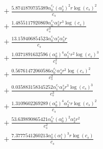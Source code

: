 \documentclass[10pt]{article}
\begin{document}
\begin{align*}
&{}  + \frac{5.8741870735389 \alpha_{0}^{c_s} \left(\alpha_{2}^s\right)^{2} r \log{\left(c_{s} \right)}^{2}}{c_{s}} \\
&{}  + \frac{1.4855117920869 \alpha_{0}^{c_s} \alpha_{3}^s r^{3} \log{\left(c_{s} \right)}}{c_{s}^{3}} \\
&{}  + \frac{13.159406854523 \alpha_{0}^{c_s} \alpha_{1}^s \alpha_{3}^s r}{c_{s}} \\
&{}  + \frac{1.0371891632596 \left(\alpha_{0}^s\right)^{4} \alpha_{1}^{c_s} r^{2} \log{\left(c_{s} \right)}^{3}}{c_{s}^{2}} \\
&{}  + \frac{0.56761472060586 \alpha_{0}^{c_s} \alpha_{4}^s r^{2} \log{\left(c_{s} \right)}^{2}}{c_{s}^{2}} \\
&{}  + \frac{0.035883158345252 \alpha_{1}^{c_s} \alpha_{2}^s r^{3} \log{\left(c_{s} \right)}^{3}}{c_{s}^{3}} \\
&{}  + \frac{1.3109602269289 \left(\alpha_{0}^s\right)^{4} \alpha_{2}^{c_s} r \log{\left(c_{s} \right)}^{2}}{c_{s}} \\
&{}  + \frac{53.639890865421 \alpha_{0}^{c_s} \left(\alpha_{0}^s\right)^{2} \alpha_{2}^s r^{2}}{c_{s}^{2}} \\
&{}  + \frac{7.3777541260213 \alpha_{0}^s \left(\alpha_{1}^s\right)^{3} r \log{\left(c_{s} \right)}}{c_{s}}
\end{align*}
\end{document}
